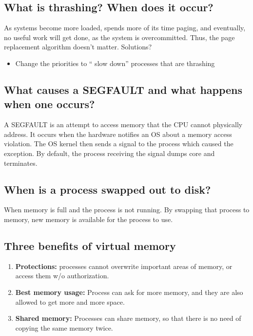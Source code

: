 \documentclass[a4paper]{article}
\begin{document}
\subsection{What is thrashing? When does it occur?} %
\label{sub:What is thrasing? When does it occurr?}
As systems become more loaded, spends more of its time paging, and eventually, no useful work will get done, as the system is
overcommitted. Thus, the page replacement algorithm doesn't matter. Solutions? \\
\begin{itemize}
  \item Change the priorities to `` slow down'' processes that are thrashing
\end{itemize}
\subsection{What causes a SEGFAULT and what happens when one occurs?} %
\label{sub:What causes a SEGFAULT and what happens when one occurs?}
A SEGFAULT is an attempt to access memory that the CPU cannot physically address. It occurs when the hardware notifies an OS
about a memory access violation. The OS kernel then sends a signal to the process which caused the exception. By default,
the process receiving the signal dumps core and terminates.
\subsection{When is a process swapped out to disk?} %
\label{sub:when is a process swapped out to disk?}
When memory is full and the process is not running. By swapping that process to memory, new memory is available for the process
to use.
\subsection{Three benefits of virtual memory} %
\label{sub:Three benefits of virtual memory}
\begin{enumerate}
  \item {\bf Protections:} processes cannot overwrite important areas of memory, or access them w/o authorization.
  \item {\bf Best memory usage:} Process can ask for more memory, and they are also allowed to get more and more space.
  \item {\bf Shared memory:} Processes can share memory, so that there is no need of copying the same memory twice.
\end{enumerate}
\end{document}
